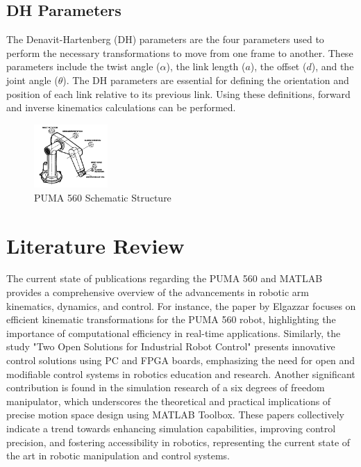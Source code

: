 \documentclass[conference]{IEEEtran}
\begin{document}
\subsection{DH Parameters}
The Denavit-Hartenberg (DH) parameters are the four parameters used to perform the necessary transformations to move from one frame to another. These parameters include the twist angle ($\alpha$), the link length ($a$), the offset ($d$), and the joint angle ($\theta$). The DH parameters are essential for defining the orientation and position of each link relative to its previous link. Using these definitions, forward and inverse kinematics calculations can be performed.
\begin{figure}[H]
    \centering
    \includegraphics[width=0.25\textwidth]{pumaDiagram.png}
    \caption{PUMA 560 Schematic Structure \cite{b12}}
    \label{fig:Schematic}
\end{figure}
\section{Literature Review}
The current state of publications regarding the PUMA 560 and MATLAB provides a comprehensive overview of the advancements in robotic arm kinematics, dynamics, and control. For instance, the paper by Elgazzar \cite{b4} focuses on efficient kinematic transformations for the PUMA 560 robot, highlighting the importance of computational efficiency in real-time applications. Similarly, the study "Two Open Solutions for Industrial Robot Control" \cite{b5} presents innovative control solutions using PC and FPGA boards, emphasizing the need for open and modifiable control systems in robotics education and research. Another significant contribution is found in the simulation research of a six degrees of freedom manipulator, which underscores the theoretical and practical implications of precise motion space design using MATLAB Toolbox. These papers collectively indicate a trend towards enhancing simulation capabilities, improving control precision, and fostering accessibility in robotics, representing the current state of the art in robotic manipulation and control systems.
\end{document}
